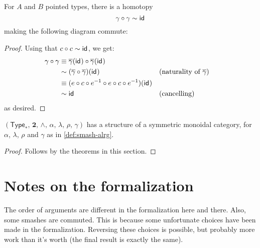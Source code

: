 \documentclass{article}
\renewcommand{\smash}{\wedge}
\renewcommand{\o}{\ensuremath{\circ}}
\newcommand{\sy}{^{-1}}
\newcommand{\gammabar}{\overline{\gamma}}
\newcommand{\pType}{\mathsf{Type}_\ast}
\newcommand{\two}{\mathbf{2}}
\begin{document}
\begin{thm}\label{thm:smash-double-braiding}
	For $A$ and $B$ pointed types, there is a homotopy
	\[\gamma \o \gamma \sim \idfunc\]
	making the following diagram commute:
	\begin{center}
	\end{center}
\end{thm}
\begin{proof}
	Using that $c \o c \sim \idfunc$, we get:
	\begin{align*}
		\gamma \o \gamma
		&\judgeq \gammabar(\idfunc) \o \gammabar(\idfunc)\\
		&\sim (\gammabar \o \gammabar)(\idfunc) &&\text{(naturality of $\gammabar$)}\\
		&\judgeq (e \o c \o e\sy \o e \o c \o e\sy)(\idfunc)\\
		&\sim \idfunc &&\text{(cancelling)}
	\end{align*}
	as desired.
\end{proof}

\begin{cor}
	$(\pType,\, \two,\, \smash,\, \alpha,\, \lambda,\, \rho,\, \gamma)$ has a structure of a symmetric monoidal category, for $\alpha$, $\lambda$, $\rho$ and $\gamma$ as in \autoref{def:smash-alrg}.
\end{cor}
\begin{proof}
	Follows by the theorems in this section.
\end{proof}


\section{Notes on the formalization}

The order of arguments are different in the formalization here and there.
Also, some smashes are commuted. This is because some unfortunate choices have been made in the formalization. Reversing these choices is possible, but probably more work than it's worth (the final result is exactly the same).
\end{document}
